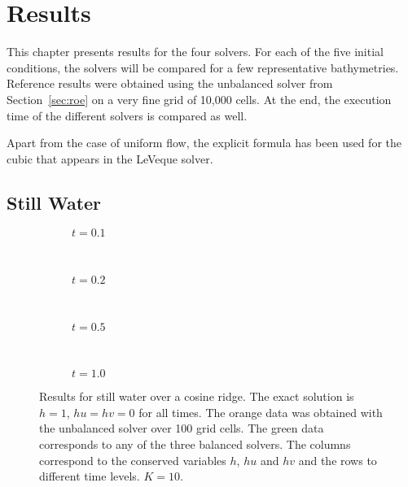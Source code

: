 \chapter{Results}
\label{ch:results}

This chapter presents results for the four solvers. For each of the five initial conditions, the solvers will be compared for a few representative bathymetries. Reference results were obtained using the unbalanced solver from Section~\ref{sec:roe} on a very fine grid of 10,000 cells. At the end, the execution time of the different solvers is compared as well.

Apart from the case of uniform flow, the explicit formula has been used for the cubic that appears in the LeVeque solver.

\section{Still Water}

\begin{figure}
  \centering
  \begin{subfigure}{\textwidth}
    \caption{$t = 0.1$}
    \label{fig:results-still-1}
  \end{subfigure} \\
  \begin{subfigure}{\textwidth}
    \caption{$t = 0.2$}
    \label{fig:results-still-2}
  \end{subfigure} \\
  \begin{subfigure}{\textwidth}
    \caption{$t = 0.5$}
    \label{fig:results-still-5}
  \end{subfigure} \\
  \begin{subfigure}{\textwidth}
    \caption{$t = 1.0$}
    \label{fig:results-still-10}
  \end{subfigure}
  \caption{Results for still water over a cosine ridge. The exact solution is $h = 1$, $hu = hv = 0$ for all times. The orange data was obtained with the unbalanced solver over 100 grid cells. The green data corresponds to any of the three balanced solvers. The columns correspond to the conserved variables $h$, $hu$ and $hv$ and the rows to different time levels. $K = 10$.}
  \label{fig:results-still}
\end{figure}

